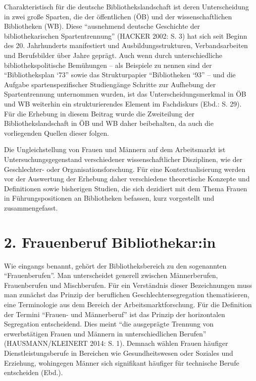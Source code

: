 \documentclass[a4paper,
fontsize=11pt,
oneside,
numbers=noperiodatend,
parskip=half-,
bibliography=totoc,
final
]{scrartcl}
\begin{document}
Charakteristisch für die deutsche Bibliothekslandschaft ist deren
Unterscheidung in zwei große Sparten, die der öffentlichen (ÖB) und der
wissenschaftlichen Bibliotheken (WB). Diese \enquote{ausnehmend deutsche
Geschichte der bibliothekarischen Spartentrennung} (HACKER 2002: S. 3)
hat sich seit Beginn des 20. Jahrhunderts manifestiert und
Ausbildungsstrukturen, Verbandsarbeiten und Berufsbilder über Jahre
geprägt. Auch wenn durch unterschiedliche bibliothekspolitische
Bemühungen -- als Beispiele zu nennen sind der \enquote{Bibliotheksplan
`73} sowie das Strukturpapier \enquote{Bibliotheken `93} -- und die
Aufgabe spartenspezifischer Studiengänge Schritte zur Aufhebung der
Spartentrennung unternommen wurden, ist das Unterscheidungsmerkmal in ÖB
und WB weiterhin ein strukturierendes Element im Fachdiskurs (Ebd.: S.
29). Für die Erhebung in diesem Beitrag wurde die Zweiteilung der
Bibliothekslandschaft in ÖB und WB daher beibehalten, da auch die
vorliegenden Quellen dieser folgen.

Die Ungleichstellung von Frauen und Männern auf dem Arbeitsmarkt ist
Untersuchungsgegenstand verschiedener wissenschaftlicher Disziplinen,
wie der Geschlechter- oder Organisationsforschung. Für eine
Kontextualisierung werden vor der Auswertung der Erhebung daher
verschiedene theoretische Konzepte und Definitionen sowie bisherigen
Studien, die sich dezidiert mit dem Thema Frauen in Führungspositionen
an Bibliotheken befassen, kurz vorgestellt und zusammengefasst.

\hypertarget{frauenberuf-bibliothekarin}{%
\section{2. Frauenberuf
Bibliothekar:in}\label{frauenberuf-bibliothekarin}}

Wie eingangs benannt, gehört der Bibliotheksbereich zu den sogenannten
\enquote{Frauenberufen}. Man unterscheidet generell zwischen
Männerberufen, Frauenberufen und Mischberufen. Für ein Verständnis
dieser Bezeichnungen muss man zunächst das Prinzip der beruflichen
Geschlechtersegregation thematisieren, eine Terminologie aus dem Bereich
der Arbeitsmarktforschung. Für die Definition der Termini
\enquote{Frauen- und Männerberuf} ist das Prinzip der horizontalen
Segregation entscheidend. Dies meint \enquote{die ausgeprägte Trennung
von erwerbstätigen Frauen und Männern in unterschiedlichen Berufen}
(HAUSMANN/KLEINERT 2014: S. 1). Demnach wählen Frauen häufiger
Dienstleistungsberufe in Bereichen wie Gesundheitswesen oder Soziales
und Erziehung, wohingegen Männer sich signifikant häufiger für
technische Berufe entscheiden (Ebd.).
\end{document}
